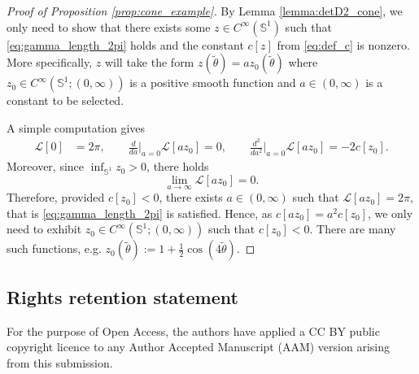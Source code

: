 \documentclass[12pt]{article}
\theoremstyle{plain}
\numberwithin{equation}{section}
\begin{document}
\begin{proof}[Proof of Proposition \ref{prop:cone_example}]
    By Lemma \ref{lemma:detD2_cone}, we only need to show that there exists some $z \in C^\infty(\mathbb{S}^1)$ such that \eqref{eq:gamma_length_2pi} holds and the constant $c[z]$ from \eqref{eq:def_c} is nonzero. More specifically, $z$ will take the form $z(\tilde \theta)  = a z_0(\tilde\theta)$ where $z_0 \in C^\infty(\mathbb{S}^1;(0,\infty))$ is a positive smooth function and $a \in (0,\infty)$ is a constant to be selected.

    A simple computation gives
    \begin{align*}
    \mathcal{L}[0] 
        &= 2\pi,\qquad    \frac{d}{da}\Big|_{a=0} \mathcal{L}[a z_0] 
        = 0, \qquad    \frac{d^2}{da^2}\Big|_{a=0} \mathcal{L}[a z_0] 
        = -2c[z_0].
    \end{align*}
    Moreover, since $\inf_{\mathbb{S}^1} z_0 > 0$, there holds
    \begin{equation*}
        \lim_{a \rightarrow \infty} \mathcal{L}[az_0]  = 0.
    \end{equation*}
    Therefore, provided $c[z_0] < 0$, there exists $a \in (0,\infty)$ such that $\mathcal{L}[az_0] = 2\pi$, that is \eqref{eq:gamma_length_2pi} is satisfied. Hence, as $c[az_0] = a^2 c[z_0]$, we only need to exhibit $z_0 \in C^\infty(\mathbb{S}^1;(0,\infty))$ such that $c[z_0] < 0$. There are many such functions, e.g. $z_0(\tilde\theta) := 1 + \frac{1}{2}\cos (4\tilde\theta)$.
\end{proof}


\subsection*{Rights retention statement} 

For the purpose of Open Access, the authors have applied a CC BY public copyright licence to any Author Accepted Manuscript (AAM) version arising from this submission.


\end{document}
